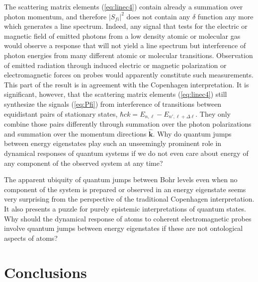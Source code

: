 \documentclass[final,3p,12pt]{elsarticle3}
\begin{document}
The scattering matrix elements (\ref{eq:linec4}) contain already a
summation over photon momentum, and therefore $|S_{\!fi}|^2$ does not 
contain any $\delta$ function any more which generates a line spectrum. 
Indeed,  any signal that tests for the electric or magnetic field
of emitted photons from a low density atomic or molecular gas would observe
a response that will not yield a line spectrum but interference of 
photon energies from many different atomic or molecular transitions.
Observation of emitted radiation through induced electric or magnetic
polarization or electromagnetic forces on probes
would apparently constitute such measurements.
This part of the result is in agreement with the Copenhagen interpretation.
It is significant, however, that the scattering matrix elements (\ref{eq:linec4}) 
still synthesize the signals (\ref{eq:Pfi}) from interference of transitions 
between equidistant pairs of stationary 
states, $\hbar ck=E_{n,\ell}-E_{n',\ell+\Delta\ell}$. They only combine those pairs 
differently through summation over the photon polarizations
and summation over the momentum directions $\hat{\bm{k}}$. 
Why do quantum jumps between energy eigenstates play such 
an unseemingly prominent role in dynamical responses of quantum systems if we
do not even care about energy of any component of the observed system
at any time?

The apparent ubiquity of quantum jumps between Bohr levels even when no
component of the system is prepared or observed in an energy eigenstate
seems very surprising from the perspective of the traditional Copenhagen 
interpretation. It also presents a puzzle for purely epistemic interpretations
of quantum states. Why should the dynamical response of atoms
to coherent electromagnetic probes involve quantum jumps between energy
eigenstates if these are not ontological aspects of atoms?


\section{Conclusions}
\label{sec:conc}
\end{document}
